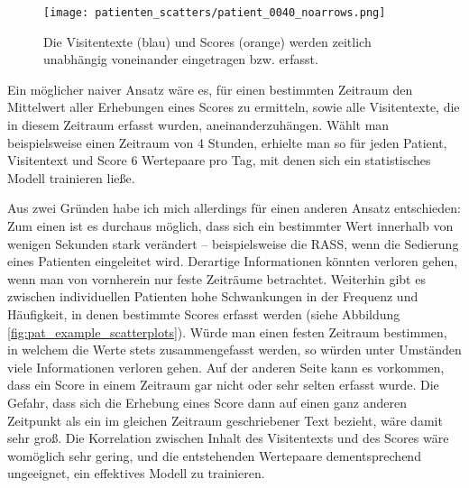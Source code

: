 \begin{figure}[htb]
    \captionsetup{justification=centering}
    \centering
    \texttt{[image: patienten\_scatters/patient\_0040\_noarrows.png]}
    \caption{Die Visitentexte (blau) und Scores (orange) werden zeitlich unabhängig voneinander eingetragen bzw. erfasst.}
    \label{fig:pat40_scatter}
\end{figure}

Ein möglicher naiver Ansatz wäre es, für einen bestimmten Zeitraum den Mittelwert aller Erhebungen eines Scores zu ermitteln, sowie alle Visitentexte, die in diesem Zeitraum erfasst wurden, aneinanderzuhängen. Wählt man beispielsweise einen Zeitraum von 4 Stunden, erhielte man so für jeden Patient, Visitentext und Score 6 Wertepaare pro Tag, mit denen sich ein statistisches Modell trainieren ließe.

Aus zwei Gründen habe ich mich allerdings für einen anderen Ansatz entschieden: Zum einen ist es durchaus möglich, dass sich ein bestimmter Wert innerhalb von wenigen Sekunden stark verändert -- beispielsweise die RASS, wenn die Sedierung eines Patienten eingeleitet wird. Derartige Informationen könnten verloren gehen, wenn man von vornherein nur feste Zeiträume betrachtet. Weiterhin gibt es zwischen individuellen Patienten hohe Schwankungen in der Frequenz und Häufigkeit, in denen bestimmte Scores erfasst werden (siehe Abbildung \ref{fig:pat_example_scatterplots}). Würde man einen festen Zeitraum bestimmen, in welchem die Werte stets zusammengefasst werden, so würden unter Umständen viele Informationen verloren gehen. Auf der anderen Seite kann es vorkommen, dass ein Score in einem Zeitraum gar nicht oder sehr selten erfasst wurde. Die Gefahr, dass sich die Erhebung eines Score dann auf einen ganz anderen Zeitpunkt als ein im gleichen Zeitraum geschriebener Text bezieht, wäre damit sehr groß. Die Korrelation zwischen Inhalt des Visitentexts und des Scores wäre womöglich sehr gering, und die entstehenden Wertepaare dementsprechend ungeeignet, ein effektives Modell zu trainieren.

